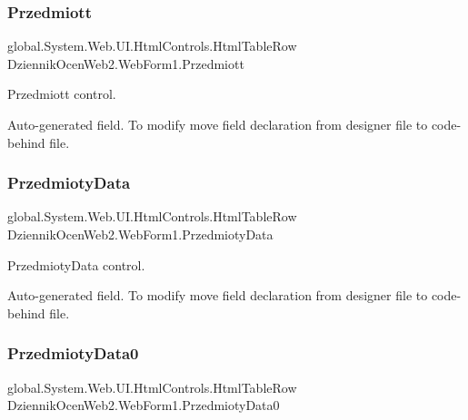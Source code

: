 \subsubsection{\texorpdfstring{Przedmiott}{Przedmiott}}
{\footnotesize\ttfamily global.\+System.\+Web.\+U\+I.\+Html\+Controls.\+Html\+Table\+Row Dziennik\+Ocen\+Web2.\+Web\+Form1.\+Przedmiott\hspace{0.3cm}{\ttfamily [protected]}}



Przedmiott control. 

Auto-\/generated field. To modify move field declaration from designer file to code-\/behind file. \mbox{\label{class_dziennik_ocen_web2_1_1_web_form1_aaf454ed1f421284f7248d2428b442739}} 
\subsubsection{\texorpdfstring{Przedmioty\+Data}{PrzedmiotyData}}
{\footnotesize\ttfamily global.\+System.\+Web.\+U\+I.\+Html\+Controls.\+Html\+Table\+Row Dziennik\+Ocen\+Web2.\+Web\+Form1.\+Przedmioty\+Data\hspace{0.3cm}{\ttfamily [protected]}}



Przedmioty\+Data control. 

Auto-\/generated field. To modify move field declaration from designer file to code-\/behind file. \mbox{\label{class_dziennik_ocen_web2_1_1_web_form1_a94d86e7b2aaea0179abc87aa43c3bbde}} 
\subsubsection{\texorpdfstring{Przedmioty\+Data0}{PrzedmiotyData0}}
{\footnotesize\ttfamily global.\+System.\+Web.\+U\+I.\+Html\+Controls.\+Html\+Table\+Row Dziennik\+Ocen\+Web2.\+Web\+Form1.\+Przedmioty\+Data0\hspace{0.3cm}{\ttfamily [protected]}}



